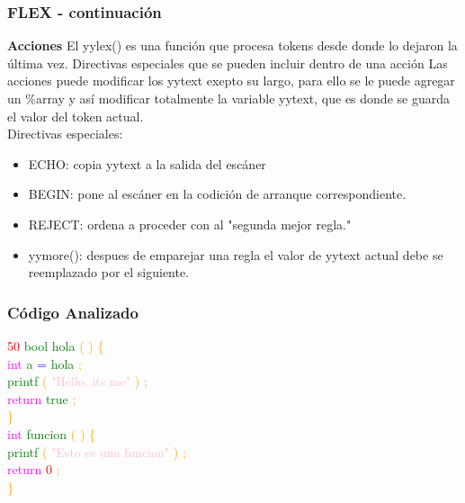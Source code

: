\documentclass{beamer}
\begin{document}
\begin{frame}
\frametitle{FLEX - continuaci\'on} 
\textbf{Acciones} \newline 
El yylex() es una funci\'on que procesa tokens desde donde lo dejaron la \'ultima vez. Directivas especiales que se pueden incluir dentro de una acci\'on \newline 
Las acciones puede modificar los yytext exepto su largo, para ello se le puede agregar un \%array y as\'i modificar totalmente la variable yytext, que es donde se guarda el valor del token actual.\\Directivas especiales:\begin{itemize} \item ECHO: copia yytext a la salida del esc\'aner  \item BEGIN: pone al esc\'aner en la codici\'on de arranque correspondiente. \item REJECT: ordena a proceder con al "segunda mejor regla." \item yymore(): despues de emparejar una regla el valor de yytext actual debe se reemplazado por el siguiente.\end{itemize}\end{frame}
\begin{frame}
\frametitle{C\'odigo Analizado}
\textcolor{red}{50} \textcolor{green}{bool} \textcolor{green}{hola} \textcolor{orange}{(} \textcolor{orange}{)} \textcolor{orange}{\{} \\ 
 \textcolor{magenta}{int} \textcolor{green}{a} \textcolor{blue}{=} \textcolor{green}{hola} \textcolor{orange}{;} \\ 
 \textcolor{green}{printf} \textcolor{orange}{(} \textcolor{pink}{"Hello, its me"} \textcolor{orange}{)} \textcolor{orange}{;} \\ 
 \textcolor{magenta}{return} \textcolor{green}{true} \textcolor{orange}{;} \\ 
 \textcolor{orange}{\}} \\ 
 \textcolor{magenta}{int} \textcolor{green}{funcion} \textcolor{orange}{(} \textcolor{orange}{)} \textcolor{orange}{\{} \\ 
 \textcolor{green}{printf} \textcolor{orange}{(} \textcolor{pink}{"Esto es una funcion"} \textcolor{orange}{)} \textcolor{orange}{;} \\ 
 \textcolor{magenta}{return} \textcolor{red}{0} \textcolor{orange}{;} \\ 
 \textcolor{orange}{\}} \\ 
 \end{frame}
\end{document}
